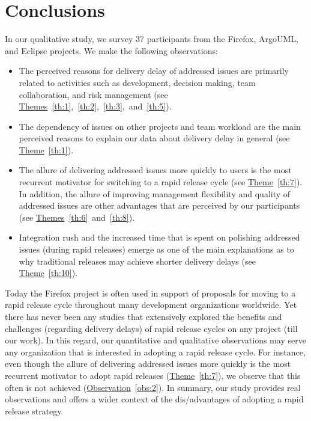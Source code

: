 \section{Conclusions} \label{ch6:conclusion}

In our qualitative study, we survey 37 participants from the Firefox, ArgoUML,
and Eclipse projects. We make the following observations:

\begin{itemize}

      \item  The perceived reasons for delivery delay of addressed issues
      	are primarily related to activities such as development, decision making, team
      	collaboration, and risk management (see
      	\hyperref[th:1]{Themes}~\ref{th:1},~\ref{th:2},~\ref{th:3},~and~\ref{th:5}). 

      \item  The dependency of issues on other projects and team workload are the main
      	perceived reasons to explain our data about delivery delay in
      	general (see \hyperref[th:1]{Theme}~\ref{th:1}).  
      	
      \item  The allure of delivering addressed issues more quickly to users
      	is the most recurrent motivator for switching to a rapid release
      	cycle (see \hyperref[th:7]{Theme}~\ref{th:7}). In addition, the
      	allure of improving management flexibility and quality of
      	addressed issues are other advantages that are perceived by our
      	participants (see \hyperref[th:6]{Themes}~\ref{th:6}~and~\ref{th:8}).

      \item Integration rush and the increased time that is spent on polishing
      	addressed issues (during rapid releases) emerge as one of the main
      	explanations as to why traditional releases may achieve shorter
      	delivery delays (see
      	\hyperref[th:10]{Theme}~\ref{th:10}).

\end{itemize}

Today the Firefox project is often used in support of proposals for moving to a
rapid release cycle throughout many development organizations worldwide. Yet
there has never been any studies that extensively explored the benefits and
challenges (regarding delivery delays) of rapid release cycles on any project
(till our work).  In this regard, our quantitative and qualitative observations
may serve any organization that is interested in adopting a rapid release cycle.
For instance, even though the allure of delivering addressed issues more quickly
is the most recurrent motivator to adopt rapid releases
(\hyperref[th:7]{Theme}~\ref{th:7}), we observe that this often is not achieved
(\hyperref[obs:2]{Observation}~\ref{obs:2}). In summary, our study provides real
observations and offers a wider context of the dis/advantages of adopting a
rapid release strategy.

